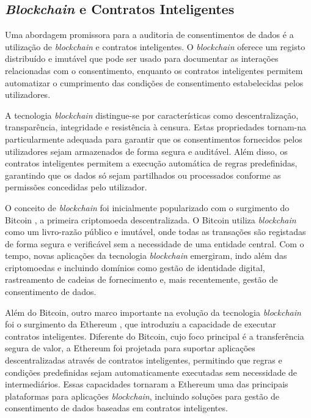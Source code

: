 \subsection{\textit{{Blockchain}} e Contratos Inteligentes}

Uma abordagem promissora para a auditoria de consentimentos de dados é a utilização de \textit{blockchain} e contratos inteligentes. O \textit{blockchain} oferece um registo distribuído e imutável que pode ser usado para documentar as interações relacionadas com o consentimento, enquanto os contratos inteligentes permitem automatizar o cumprimento das condições de consentimento estabelecidas pelos utilizadores. 

A tecnologia \textit{blockchain} distingue-se por características como descentralização, transparência, integridade e resistência à censura. Estas propriedades tornam-na particularmente adequada para garantir que os consentimentos fornecidos pelos utilizadores sejam armazenados de forma segura e auditável. Além disso, os contratos inteligentes permitem a execução automática de regras predefinidas, garantindo que os dados só sejam partilhados ou processados conforme as permissões concedidas pelo utilizador.

O conceito de \textit{blockchain} foi inicialmente popularizado com o surgimento do Bitcoin \citep{nakamoto2008bitcoin}, a primeira criptomoeda descentralizada. O Bitcoin utiliza \textit{blockchain} como um livro-razão público e imutável, onde todas as transações são registadas de forma segura e verificável sem a necessidade de uma entidade central. Com o tempo, novas aplicações da tecnologia \textit{blockchain} emergiram, indo além das criptomoedas e incluindo domínios como gestão de identidade digital, rastreamento de cadeias de fornecimento e, mais recentemente, gestão de consentimento de dados.

Além do Bitcoin, outro marco importante na evolução da tecnologia \textit{blockchain} foi o surgimento da Ethereum \citep{buterin2014next}, que introduziu a capacidade de executar contratos inteligentes. Diferente do Bitcoin, cujo foco principal é a transferência segura de valor, a Ethereum foi projetada para suportar aplicações descentralizadas através de contratos inteligentes, permitindo que regras e condições predefinidas sejam automaticamente executadas sem necessidade de intermediários. Essas capacidades tornaram a Ethereum uma das principais plataformas para aplicações \textit{blockchain}, incluindo soluções para gestão de consentimento de dados baseadas em contratos inteligentes.

